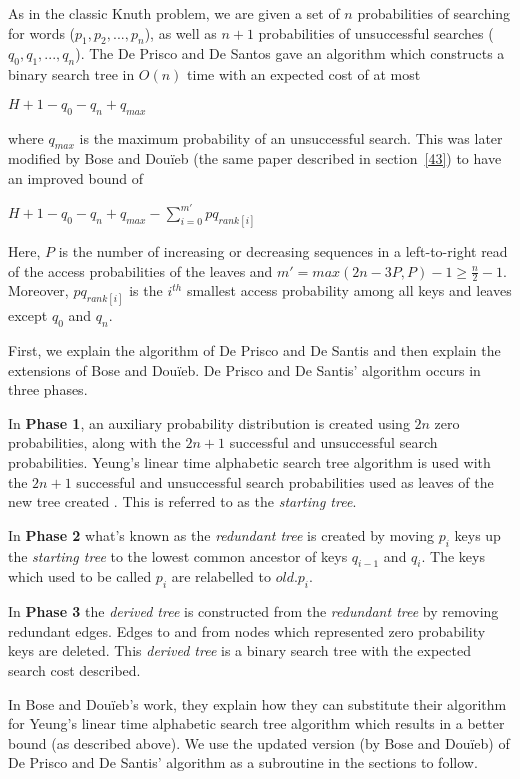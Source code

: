 \documentclass[letterpaper,12pt,titlepage,oneside,final]{book}
\theoremstyle{plain}
\begin{document}
As in the classic Knuth problem, we are given a set of $n$ probabilities of searching for words ($p_1, p_2, ..., p_n$), as well as $n+1$ probabilities of unsuccessful searches ($q_0, q_1, ..., q_n$). The De Prisco and De Santos gave an algorithm which constructs a binary search tree in $O(n)$ time with an expected cost of at most \cite{de1993binary}
\begin{center}
$H+1-q_0-q_n+q_{max}$
\end{center}  where $q_{max}$ is the maximum probability of an unsuccessful search. This was later modified by Bose and Dou\"{i}eb (the same paper described in section~\ref{43}) to have an improved bound of \cite{bose2009efficient}
\begin{center}
$H + 1 - q_0 - q_n + q_{max} - \sum_{i=0}^{m'} pq_{rank[i]}$
\end{center}
Here, $P$ is the number of increasing or decreasing sequences in a left-to-right read of the access probabilities of the leaves and $m'=max({2n-3P,P})-1 \geq \frac{n}{2} - 1$.  Moreover, $pq_{rank[i]}$ is the $i^{th}$ smallest access probability among all keys and leaves except $q_0$ and $q_n$.

First, we explain the algorithm of De Prisco and De Santis and then explain the extensions of Bose and Dou\"{i}eb. De Prisco and De Santis' algorithm occurs in three phases.

In \textbf{Phase 1}, an auxiliary probability distribution is created using $2n$ zero probabilities, along with the $2n+1$ successful and unsuccessful search probabilities. Yeung's linear time alphabetic search tree algorithm is used with the $2n+1$ successful and unsuccessful search probabilities used as leaves of the new tree created \cite{yeung1991alphabetic}. This is referred to as the \textit{starting tree}.

In \textbf{Phase 2} what's known as the \textit{redundant tree} is created by moving $p_i$ keys up the \textit{starting tree} to the lowest common ancestor of keys $q_{i-1}$ and $q_i$. The keys which used to be called $p_i$ are relabelled to $old.p_i$.

In \textbf{Phase 3} the \textit{derived tree} is constructed from the \textit{redundant tree} by removing redundant edges. Edges to and from nodes which represented zero probability keys are deleted. This \textit{derived tree} is a binary search tree with the expected search cost described.

In Bose and Dou\"{i}eb's work, they explain how they can substitute their algorithm for Yeung's linear time alphabetic search tree algorithm which results in a better bound (as described above). We use the updated version (by Bose and Dou\"{i}eb) of De Prisco and De Santis' algorithm as a subroutine in the sections to follow.
\end{document}
